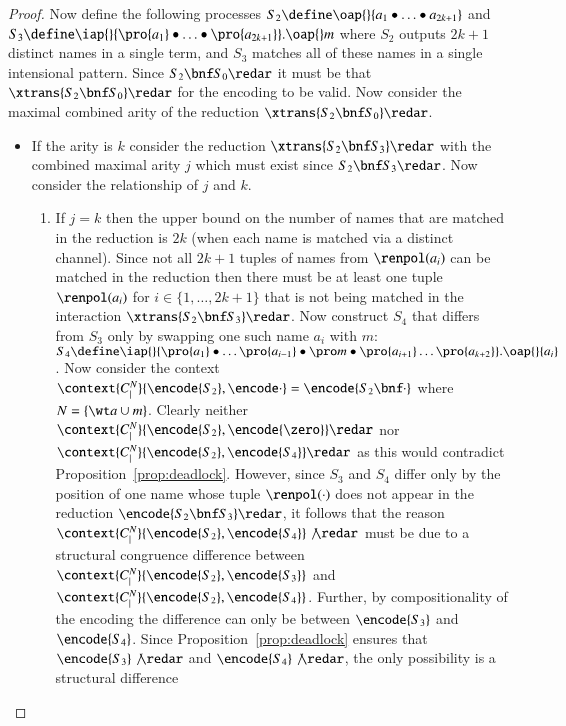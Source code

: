 \documentclass[submission,copyright,creativecommons]{eptcs}
\begin{document}
\begin{proof}
Now define the following processes 
$S_2 \define \oap {} {a_1\bullet\ldots\bullet a_{2k+1}}$
and
$S_3 \define \iap {} {\pro{a_1}\bullet\ldots\bullet\pro{a_{2k+1}}} . \oap {} m$
where $S_2$ outputs $2k+1$ distinct names in a single term, and $S_3$ matches all of these names in
a single intensional pattern.
Since $S_2\bnf S_0\redar$ it must be that $\xtrans{S_2\bnf S_0}\redar$
for the encoding to be valid.
Now consider the maximal combined arity of the reduction $\xtrans{S_2\bnf S_0}\redar$.
\begin{itemize}
\item If the arity is $k$ 
  consider the reduction $\xtrans{S_2\bnf S_3}\redar$ with the combined maximal arity $j$ which
  must exist since $S_2\bnf S_3\redar$.
  Now consider the relationship of $j$ and $k$.
  \begin{enumerate}
  \item If $j=k$ 
    then the upper bound on the number of names that are matched in the
    reduction is $2k$ (when each name is matched via a distinct channel).
    Since not all $2k+1$ tuples of names from $\renpol (a_i)$ can be matched in the reduction then
    there must be at least one tuple $\renpol (a_i)$ for $i\in\{1,\ldots,2k+1\}$ that is not being
    matched in the interaction $\xtrans{S_2 \bnf S_3}\redar $.
    Now construct $S_4$ that differs from $S_3$ only by swapping one such name $a_i$ with
    $m$: $
    S_4 \define \iap {} {\pro{a_1}\bullet\ldots\pro{a_{i-1}}\bullet\pro m
    \bullet\pro{a_{i+1}}\ldots\pro{a_{k+2}}}. \oap {} {a_i}$.
    Now consider the context $\context {C^N_|} {\encode{S_2},\encode\cdot}=\encode{S_2\bnf \cdot}$
    where $N=\{\wt a\cup m\}$.
    Clearly neither $\context {C^N_|} {\encode{S_2},\encode{\zero}}\redar$ nor
    $\context {C^N_|} {\encode{S_2},\encode{S_4}}\redar$ as this would contradict
    Proposition~\ref{prop:deadlock}.
    However, since $S_3$ and $S_4$ differ only by the position of one name whose tuple $\renpol(\cdot)$
    does not appear in the
    reduction $\encode{S_2\bnf S_3}\redar$, it follows that the reason 
    $\context {C^N_|} {\encode{S_2},\encode{S_4}}\not\redar$ must be due to a structural
    congruence difference between $\context {C^N_|} {\encode{S_2},\encode{S_3}}$
    and $\context {C^N_|} {\encode{S_2},\encode{S_4}}$.
    Further, by compositionality of the encoding the difference can only be between
    $\encode{S_3}$ and $\encode{S_4}$.
    Since Proposition~\ref{prop:deadlock} ensures that $\encode{S_3}\not\redar$
    and $\encode{S_4}\not\redar$, the only possibility is a structural difference

\end{enumerate}
\end{itemize}
\end{proof}
\end{document}
